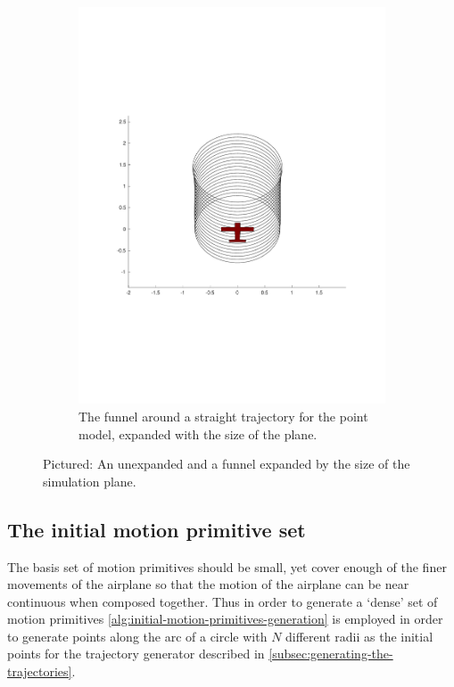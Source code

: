 \begin{figure}
\begin{subfigure}{0.5\textwidth}
    \includegraphics[trim={2cm 5cm 0cm 5cm},
    width=\textwidth]{figures/experiments/expanded-funnel-with-plane}
    \caption{The funnel around a straight trajectory for the point model,
      expanded with the size of the plane.}
  \end{subfigure}
  \caption{Pictured: An unexpanded and a funnel expanded by the size of the
    simulation plane.}
  \label{fig:expanded-and-unexpanded}
\end{figure}

\subsection{The initial motion primitive set}
\label{subsec:initial-motion-primitive}

The basis set of motion primitives should be small, yet cover enough of the
finer movements of the airplane so that the motion of the airplane can be near
continuous when composed together. Thus in order to generate a `dense' set of
motion primitives \cref{alg:initial-motion-primitives-generation} is employed in
order to generate points along the arc of a circle with \(N\) different radii as
the initial points for the trajectory generator described in
\cref{subsec:generating-the-trajectories}.

